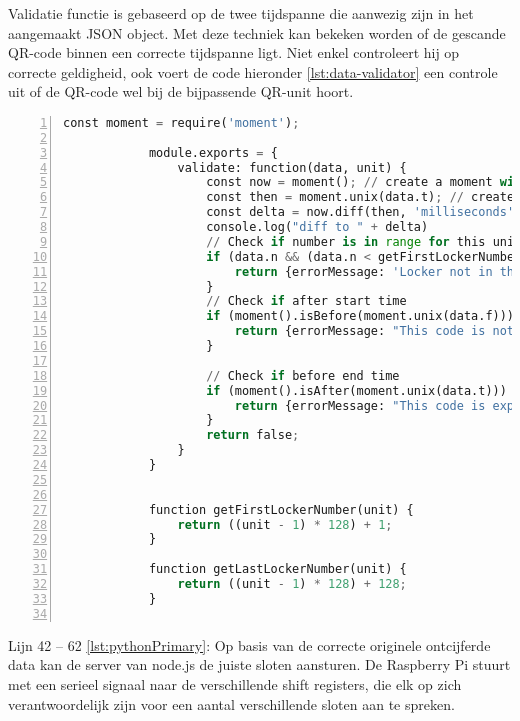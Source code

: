 \begin{enumerate}
\begin{lstlisting}[language=Python, caption={ De parameter genaamd ‘code’ wordt verwerkt en ontcijferd, indien de QR-data is aangepast zal het een error terug geven.}, label=lst:function, numbers=left]
                \end{lstlisting}
   
        Validatie functie is gebaseerd op de twee tijdspanne die aanwezig zijn in het aangemaakt \ac{JSON} object. Met deze techniek kan bekeken worden of de gescande QR-code binnen een correcte tijdspanne ligt. Niet enkel controleert hij op correcte geldigheid, ook voert de code hieronder \ref{lst:data-validator} een controle uit of de QR-code wel bij de bijpassende QR-unit hoort.
        
        \begin{lstlisting}[language=Python, caption={ Valideer functie van de gescande QR-data op geldigheid en controle om na te gaan of gescande lockernummer in QR-unit zit.}, label=lst:data-validator, numbers=left]
            const moment = require('moment');
            
            module.exports = {
                validate: function(data, unit) {
                    const now = moment(); // create a moment with the current time
                    const then = moment.unix(data.t); // create a moment with the other time timestamp in seconds
                    const delta = now.diff(then, 'milliseconds'); // get the millisecond difference
                    console.log("diff to " + delta)
                    // Check if number is in range for this unit (number is not mandatory)
                    if (data.n && (data.n < getFirstLockerNumber(unit) || data.n > getLastLockerNumber(unit))) {
                        return {errorMessage: 'Locker not in this unit'}
                    }
                    // Check if after start time
                    if (moment().isBefore(moment.unix(data.f))) {
                        return {errorMessage: "This code is not yet valid"}
                    }
                    
                    // Check if before end time
                    if (moment().isAfter(moment.unix(data.t))) {
                        return {errorMessage: "This code is expired"}
                    }
                    return false;
                }
            }
            
            
            function getFirstLockerNumber(unit) {
                return ((unit - 1) * 128) + 1;
            }
            
            function getLastLockerNumber(unit) {
                return ((unit - 1) * 128) + 128;
            }
            
        \end{lstlisting}
        
        
    Lijn 42 – 62 \ref{lst:pythonPrimary}: Op basis van de correcte originele ontcijferde data kan de server van node.js de juiste sloten aansturen. De Raspberry Pi stuurt met een serieel signaal naar de verschillende shift registers, die elk op zich verantwoordelijk zijn voor een aantal verschillende sloten aan te spreken. 
    
    
\end{enumerate}

